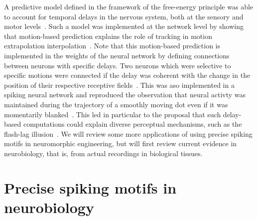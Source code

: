 \documentclass[brainsci, %
               review,submit,pdftex,moreauthors%
               ]{Definitions/mdpi}
\begin{document}
A predictive model defined in the framework of the free-energy principle was able to account for temporal delays in the nervous system, both at the sensory and motor levels~\citep{perrinet_active_2014}.  %
Such a model was implemented at the network level by showing that motion-based prediction explains the role of tracking in motion extrapolation interpolation~\citep{khoei_motion-based_2013}. Note that this motion-based prediction is implemented in the weights of the neural network by defining connections between neurons with specific delays.  Two neurons which were selective to specific motions were connected if the delay was coherent with the change in the position of their respective receptive fields~\citep{hogendoorn_predictive_2019}. This was aso implemented in a spiking neural network and reproduced the observation that neural activty was maintained during the trajectory of a smoothly moving dot even if it was momentarily blanked~\citep{kaplan_anisotropic_2013}. This led in particular to the proposal that such delay-based computations could explain diverse perceptual mechanisms, such as the flash-lag illusion~\citep{khoei_flash-lag_2017}. 
We will review some more applications of using precise spiking motifs in neuromorphic engineering, but will first review current evidence in neurobiology, that is, from actual recordings in biological tissues.
 \section{Precise spiking motifs in neurobiology}
%
\end{document}
